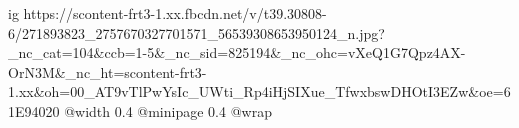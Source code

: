  
 
 
 
 

\ifcmt
  ig https://scontent-frt3-1.xx.fbcdn.net/v/t39.30808-6/271893823_2757670327701571_56539308653950124_n.jpg?_nc_cat=104&ccb=1-5&_nc_sid=825194&_nc_ohc=vXeQ1G7Qpz4AX-OrN3M&_nc_ht=scontent-frt3-1.xx&oh=00_AT9vTlPwYsIc_UWti_Rp4iHjSIXue_TfwxbswDHOtI3EZw&oe=61E94020
  @width 0.4
  @minipage 0.4
  @wrap \parpic[r]
\fi
